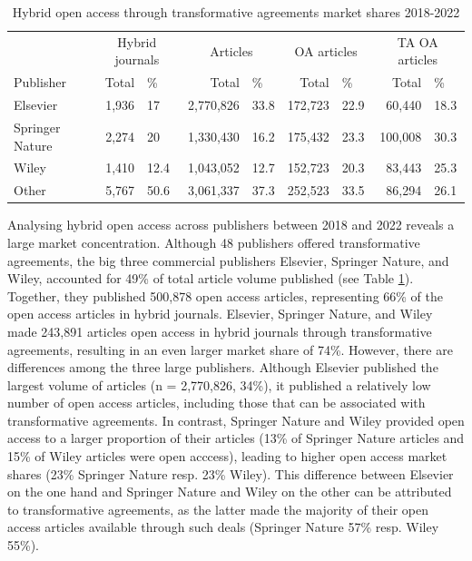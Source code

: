 \documentclass[a4paper,man,floatsintext,longtable,noextraspace,12pt]{apa6}
\begin{document}
\begin{table}[H]

\caption{\label{tab:publisher_league_table}Hybrid open access through transformative agreements market shares 2018-2022}
\centering
\begin{tabular}[t]{lrlrlrlrl}
\toprule
\multicolumn{1}{c}{ } & \multicolumn{2}{c}{Hybrid journals} & \multicolumn{2}{c}{Articles} & \multicolumn{2}{c}{OA articles} & \multicolumn{2}{c}{TA OA articles} \\
\cmidrule(l{3pt}r{3pt}){2-3} \cmidrule(l{3pt}r{3pt}){4-5} \cmidrule(l{3pt}r{3pt}){6-7} \cmidrule(l{3pt}r{3pt}){8-9}
Publisher & Total & \% & Total & \% & Total & \% & Total & \%\\
\midrule
Elsevier & 1,936 & 17 & 2,770,826 & 33.8 & 172,723 & 22.9 & 60,440 & 18.3\\
Springer Nature & 2,274 & 20 & 1,330,430 & 16.2 & 175,432 & 23.3 & 100,008 & 30.3\\
Wiley & 1,410 & 12.4 & 1,043,052 & 12.7 & 152,723 & 20.3 & 83,443 & 25.3\\
Other & 5,767 & 50.6 & 3,061,337 & 37.3 & 252,523 & 33.5 & 86,294 & 26.1\\
\bottomrule
\end{tabular}
\end{table}

Analysing hybrid open access across publishers between 2018 and 2022
reveals a large market concentration. Although 48 publishers offered
transformative agreements, the big three commercial publishers Elsevier,
Springer Nature, and Wiley, accounted for 49\% of total article volume
published (see Table \ref{tab:publisher_league_table}). Together, they
published 500,878 open access articles, representing 66\% of the open
access articles in hybrid journals. Elsevier, Springer Nature, and Wiley
made 243,891 articles open access in hybrid journals through
transformative agreements, resulting in an even larger market share of
74\%. However, there are differences among the three large publishers.
Although Elsevier published the largest volume of articles (n =
2,770,826, 34\%), it published a relatively low number of open access
articles, including those that can be associated with transformative
agreements. In contrast, Springer Nature and Wiley provided open access
to a larger proportion of their articles (13\% of Springer Nature
articles and 15\% of Wiley articles were open acccess), leading to
higher open access market shares (23\% Springer Nature resp. 23\%
Wiley). This difference between Elsevier on the one hand and Springer
Nature and Wiley on the other can be attributed to transformative
agreements, as the latter made the majority of their open access
articles available through such deals (Springer Nature 57\% resp. Wiley
55\%).
\end{document}
